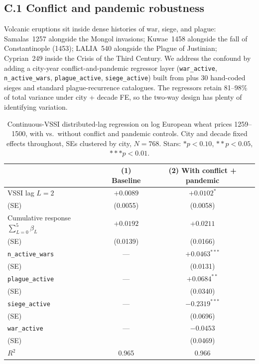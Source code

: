 \documentclass[11pt,letterpaper]{article}
\begin{document}
\subsection*{C.1 Conflict and pandemic robustness}
\label{app:conflict-robust}

Volcanic eruptions sit inside dense histories of war, siege, and plague: Samalas~1257 alongside the Mongol invasions; Kuwae~1458 alongside the fall of Constantinople (1453); LALIA~540 alongside the Plague of Justinian; Cyprian~249 inside the Crisis of the Third Century. We address the confound by adding a city-year conflict-and-pandemic regressor layer (\texttt{war\_active}, \texttt{n\_active\_wars}, \texttt{plague\_active}, \texttt{siege\_active}) built from \citet{brecke1999} plus 30 hand-coded sieges and standard plague-recurrence catalogues. The regressors retain 81--98\% of total variance under city + decade FE, so the two-way design has plenty of identifying variation.

\begin{table}[H]
\centering
\caption{Continuous-VSSI distributed-lag regression on log European wheat prices 1259--1500, with vs.\ without conflict and pandemic controls. City and decade fixed effects throughout, SEs clustered by city, $N=768$. Stars: $* p<0.10$, $** p<0.05$, $*** p<0.01$.}
\label{tab:volcanic-robust}
\small
\begin{tabular}{lcc}
\toprule
 & (1) Baseline & (2) With conflict + pandemic \\
\midrule
VSSI lag $L=2$ & $+0.0089$ & $+0.0102^{*}$ \\
\quad (SE) & (0.0055) & (0.0058) \\
\midrule
Cumulative response $\sum_{L=0}^{5} \beta_L$ & $+0.0192$ & $+0.0211$ \\
\quad (SE) & (0.0139) & (0.0166) \\
\midrule
\texttt{n\_active\_wars} & --- & $+0.0463^{***}$ \\
\quad (SE) &  & (0.0131) \\
\texttt{plague\_active}  & --- & $+0.0684^{**}$ \\
\quad (SE) &  & (0.0340) \\
\texttt{siege\_active}   & --- & $-0.2319^{***}$ \\
\quad (SE) &  & (0.0696) \\
\texttt{war\_active}     & --- & $-0.0453$ \\
\quad (SE) &  & (0.0469) \\
\midrule
$R^2$ & 0.965 & 0.966 \\
\bottomrule
\end{tabular}
\end{table}
\end{document}

